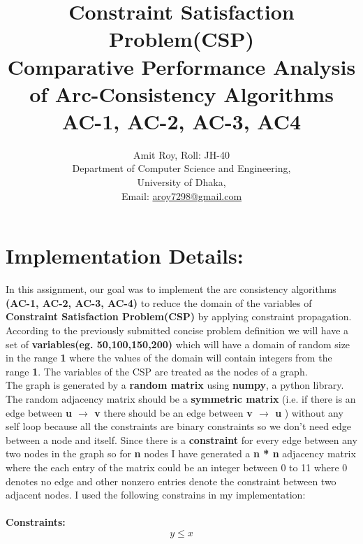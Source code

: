 \documentclass[11pt , conference]{IEEEtran}
\begin{document}
	
	\title{\LARGE Constraint Satisfaction Problem(CSP) \\Comparative Performance Analysis of Arc-Consistency Algorithms\\AC-1, AC-2, AC-3, AC4}
	\author
	{	Amit Roy, Roll: JH-40
		\\Department of Computer Science and Engineering,\\University of Dhaka,\\Email: \href{mailto:aroy7298@gmail.com}{aroy7298@gmail.com}
	}
	\maketitle
	\fontsize{12pt}{12pt}\selectfont\noindent
	
		\section{Implementation Details:}
	In this assignment, our goal was to implement the arc consistency algorithms \textbf{(AC-1, AC-2, AC-3, AC-4)} to reduce the domain of the variables of \textbf{Constraint Satisfaction Problem(CSP)} by applying constraint propagation.\\
	According to the previously submitted concise problem definition we will have a set of \textbf{variables(eg. 50,100,150,200)} which will have a domain of random size in the range \textbf{1} where the values of the domain will contain integers from the range \textbf{1}. The variables of the CSP are treated as the nodes of a graph.\\The graph is generated by a \textbf{random matrix} using \textbf{numpy}, a python library. The random adjacency matrix should be a \textbf{symmetric matrix} (i.e. if there is an edge between \textbf{u $\rightarrow$ v} there should be an edge between \textbf{v $\rightarrow$ u} ) without any self loop because all the constraints are binary constraints so we don't need edge between a node and itself. Since there is a \textbf{constraint} for every edge between  any two nodes in the graph so for \textbf{n} nodes I have generated a \textbf{n * n} adjacency matrix where the each entry of the matrix could be an integer between 0 to 11 where 0 denotes no edge and other nonzero entries denote the constraint between two adjacent nodes. I used the following constrains in my implementation:\\\\\textbf{Constraints:}
	\begin{equation}
	y \leq x
	\end{equation}
\end{document}
